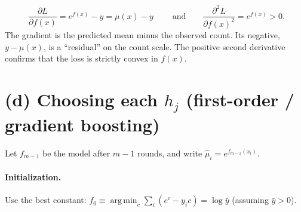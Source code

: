 \documentclass[11pt]{article}
\DeclareMathOperator*{\argmin}{arg\,min}
\begin{document}
\[
\boxed{\;\frac{\partial L}{\partial f(x)}=e^{f(x)}-y=\mu(x)-y\;}
\qquad\text{and}\qquad
\frac{\partial^2L}{\partial f(x)^2}=e^{f(x)}>0 .
\]
The gradient is the predicted mean minus the observed count. Its negative,
$y-\mu(x)$, is a ``residual'' on the count scale. The positive second derivative confirms that the
loss is strictly convex in $f(x)$.

\section*{(d) Choosing each $h_j$ (first-order / gradient boosting)}

Let $f_{m-1}$ be the model after $m-1$ rounds, and write $\hat\mu_i=e^{f_{m-1}(x_i)}$.

\paragraph{Initialization.} Use the best constant:
$f_0\equiv\argmin_c\sum_i(e^c-y_ic)=\log\bar y$ (assuming $\bar y>0$).
\end{document}
